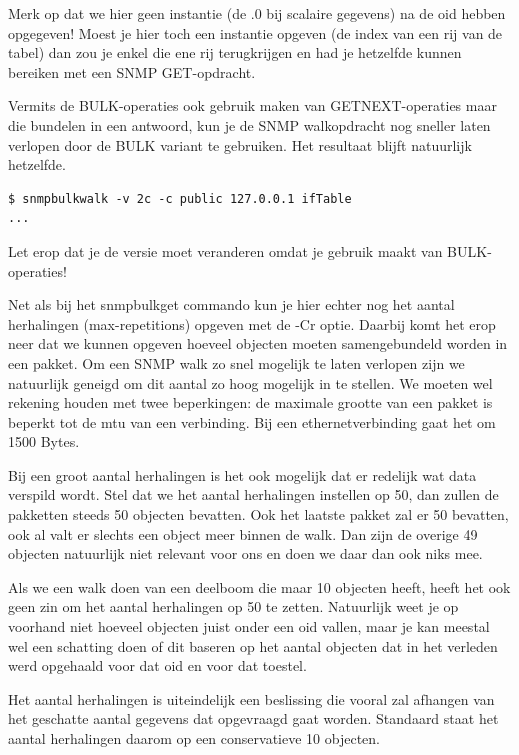 Merk op dat we hier geen instantie (de .0 bij scalaire gegevens) na de \gls{oid} hebben opgegeven!
Moest je hier toch een instantie opgeven (de index van een rij van de tabel) dan zou je enkel die ene rij terugkrijgen
en had je hetzelfde kunnen bereiken met een SNMP GET-opdracht.

Vermits de BULK-operaties ook gebruik maken van GETNEXT-operaties maar die bundelen in een antwoord,
kun je de SNMP walkopdracht nog sneller laten verlopen door de BULK variant te gebruiken.
Het resultaat blijft natuurlijk hetzelfde.

\begin{lstlisting}[caption={SNMP walkopdracht m.b.v. BULK-operaties}, label=netsnmp-bulkwalk]
$ snmpbulkwalk -v 2c -c public 127.0.0.1 ifTable
...
\end{lstlisting}

Let erop dat je de versie moet veranderen omdat je gebruik maakt van BULK-operaties!

Net als bij het snmpbulkget commando kun je hier echter nog het aantal herhalingen (max-repetitions) opgeven met de -Cr optie.
Daarbij komt het erop neer dat we kunnen opgeven hoeveel objecten moeten samengebundeld worden in een pakket.
Om een SNMP walk zo snel mogelijk te laten verlopen zijn we natuurlijk geneigd om dit aantal zo hoog mogelijk in te stellen.
We moeten wel rekening houden met twee beperkingen: de maximale grootte van een pakket is beperkt tot de \gls{mtu} van een verbinding.
Bij een ethernetverbinding gaat het om 1500 Bytes.

Bij een groot aantal herhalingen is het ook mogelijk dat er redelijk wat data verspild wordt.
Stel dat we het aantal herhalingen instellen op 50, dan zullen de pakketten steeds 50 objecten bevatten.
Ook het laatste pakket zal er 50 bevatten, ook al valt er slechts een object meer binnen de walk.
Dan zijn de overige 49 objecten natuurlijk niet relevant voor ons en doen we daar dan ook niks mee.

Als we een walk doen van een deelboom die maar 10 objecten heeft, heeft het ook geen zin om het aantal herhalingen op 50 te zetten.
Natuurlijk weet je op voorhand niet hoeveel objecten juist onder een \gls{oid} vallen,
maar je kan meestal wel een schatting doen of dit baseren op het aantal objecten dat in het verleden werd opgehaald voor dat \gls{oid} en voor dat toestel.

Het aantal herhalingen is uiteindelijk een beslissing die vooral zal afhangen van het geschatte aantal gegevens dat opgevraagd gaat worden.
Standaard staat het aantal herhalingen daarom op een conservatieve 10 objecten.


